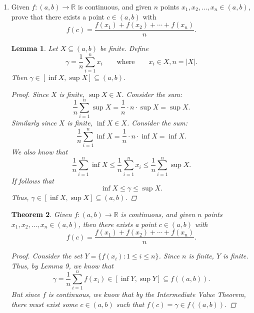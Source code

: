 \documentclass{amsart}
\newtheorem{theorem}{Theorem}
\newtheorem{lemma}[theorem]{Lemma}
\begin{document}
\begin{enumerate}[1.]
    \newpage
    \item Given $f:(a,b) \to \mathbb{R}$ is continuous, and given $n$ points $x_1,x_2,\ldots, x_n \in (a,b)$, prove that there exists a point $c \in (a,b)$ with
    \[ f(c) = \frac{f(x_1) + f(x_2) + \cdots + f(x_n)}{n}.\]
    \begin{lemma}
        Let $X \subseteq (a, b)$ be finite. Define 
        \[
            \gamma = \frac{1}{n} \sum_{i = 1}^n x_i \qquad \text{where} \qquad x_i \in X, n = |X|. 
        \]
        Then $\gamma \in [\inf X, \sup X] \subseteq (a,b)$.
        \begin{proof}
            Since $X$ is finite, $\sup X \in X$. Consider the sum: 
            \[
                \frac{1}{n} \sum_{i = 1}^n \sup X =  \frac{1}{n}\cdot n\cdot \sup X = \sup X.  
            \]
            Similarly since $X$ is finite, $\inf X \in X$. Consider the sum:
            \[
                \frac{1}{n} \sum_{i = 1}^n \inf X =  \frac{1}{n}\cdot n\cdot \inf X = \inf X.  
            \]
            We also know that
            \[
                \frac{1}{n}\sum_{i = 1}^n \inf X \leq \frac{1}{n}\sum_{i = 1}^n x_i \leq \frac{1}{n}\sum_{i = 1}^n \sup X.
            \]
            If follows that 
            \[
                \inf X \leq \gamma \leq \sup X.
            \]
            Thus, $\gamma \in [\inf X, \sup X] \subseteq (a,b)$.
        \end{proof}
    \end{lemma}

    \begin{theorem}
        Given $f:(a,b) \to \mathbb{R}$ is continuous, and given $n$ points $x_1,x_2,\ldots, x_n \in (a,b)$, then there exists a point $c \in (a,b)$ with
        \[ f(c) = \frac{f(x_1) + f(x_2) + \cdots + f(x_n)}{n}.\]
        \begin{proof}
            Consider the set $Y = \{ f(x_i): 1 \leq i \leq n \}$. Since $n$ is finite, $Y$ is finite.
            Thus, by Lemma 9, we know that 
            \[
                \gamma = \frac{1}{n} \sum_{i = 1}^n f(x_i) \in [\inf Y, \sup Y] \subseteq f((a,b)).
            \]
            But since $f$ is continuous, we know that by the Intermediate Value Theorem, there must exist some $c \in (a, b)$
            such that $f(c) = \gamma \in f((a,b))$.
        \end{proof}
    \end{theorem}
    

\end{enumerate}
\end{document}
